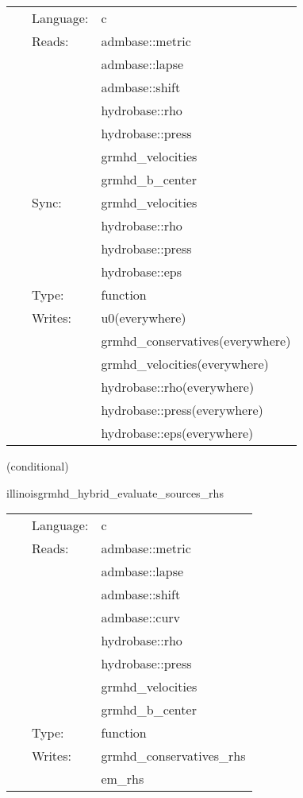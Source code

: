 \documentclass{article}
\begin{document}
 \begin{tabular*}{160mm}{cll} 
~ & Language:  & c \\ 
~ & Reads:  & admbase::metric \\ 
~& ~ &admbase::lapse\\ 
~& ~ &admbase::shift\\ 
~& ~ &hydrobase::rho\\ 
~& ~ &hydrobase::press\\ 
~& ~ &grmhd\_velocities\\ 
~& ~ &grmhd\_b\_center\\ 
~ & Sync:  & grmhd\_velocities \\ 
~& ~ &hydrobase::rho\\ 
~& ~ &hydrobase::press\\ 
~& ~ &hydrobase::eps\\ 
~ & Type:  & function \\ 
~ & Writes:  & u0(everywhere) \\ 
~& ~ &grmhd\_conservatives(everywhere)\\ 
~& ~ &grmhd\_velocities(everywhere)\\ 
~& ~ &hydrobase::rho(everywhere)\\ 
~& ~ &hydrobase::press(everywhere)\\ 
~& ~ &hydrobase::eps(everywhere)\\ 
\end{tabular*} 


\vspace{5mm}

   (conditional) 

\hspace{5mm} illinoisgrmhd\_hybrid\_evaluate\_sources\_rhs 

\hspace{5mm}{\it hybrid version of illinoisgrmhd\_evaluate\_sources\_rhs } 


\hspace{5mm}

 \begin{tabular*}{160mm}{cll} 
~ & Language:  & c \\ 
~ & Reads:  & admbase::metric \\ 
~& ~ &admbase::lapse\\ 
~& ~ &admbase::shift\\ 
~& ~ &admbase::curv\\ 
~& ~ &hydrobase::rho\\ 
~& ~ &hydrobase::press\\ 
~& ~ &grmhd\_velocities\\ 
~& ~ &grmhd\_b\_center\\ 
~ & Type:  & function \\ 
~ & Writes:  & grmhd\_conservatives\_rhs \\ 
~& ~ &em\_rhs\\ 
\end{tabular*} 
\end{document}
